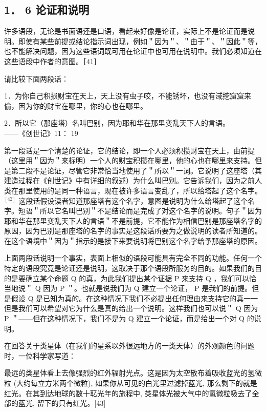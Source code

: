 \subsection{1． 6 论证和说明}
许多语段，无论是书面语还是口语，看起来好像是论证，实际上不是论证而是说明。即使有某些前提或结论指示词出现，例如＂因为＂、＂由于＂、＂因此＂等，也不能解决问题，因为这些语词既可用在论证中也可用在说明中。我们必须知道在这些语段中作者的意图。［41］

请比较下面两段话：

1．为你自己积损财宝在天上，天上没有虫子咬，不能锈坏，也没有淢挖窟窟来偷，因为你的财宝在哪里，你的心也在哪里。

2．所以它（那座塔）名叫巴别，因为耶和华在那里变乱天下人的言语。\\
——《创世记》11： 19

第一段话是一个清楚的论证，它的结论，即一个人必须积攒财宝在天上，由前提（这里用＂因为＂来标明）一个人的财宝积攒在哪里，他的心也在哪里来支持。但是第二段不是论证，尽管它非常恰当地使用了＂所以＂一词。它说明了这座塔（其建造过程在《创世记》中有详细的叙述）为什么叫巴别。它告诉我们，因为之前人类在那里使用的是同一种语言，现在被许多语言变乱了，所以给塔起了这个名字。 ${ }^{[42]}$ 这段话假设读者知道那座塔有这个名字，意图是说明为什么给塔起了这个名字。短语＂所以它名叫巴别＂不是结论而是完成了对这个名字的说明。句子＂因为耶和华在那里变乱天下人的言语＂不是前提，它不能作为相信巴别是那座塔名字的原因，因为巴别是那座塔的名字的事实是这段话所要为之做说明的读者所知道的。在这个语境中＂因为＂指示的是接下来要说明将巴别这个名字给予那座塔的原因。

上面两段话说明一个事实，表面上相似的语段可能具有完全不同的功能。任何一个特定的语段究竟是论证还是说明，这取决于那个语段所服务的目的。如果我们的目的是要确立某个命题 Q 的真，为此我们提出某个证据 P 来支持 Q ，我们可以恰当地说＂ Q 因为 P ＂。也就是说我们为 Q 建立一个论证， P 是我们的前提。但是假设 Q 是已知为真的。在这种情况下我们不必提出任何理由来支持它的真一一但是我们可以希望对它为什么是真的给出一个说明。这样我们也可以说＂ Q 因为 P ＂——但在这种情况下，我们不是为 Q 建立一个论证，而是给出一个对 Q 的说明。

在回答关于类星体（在我们的星系以外很远地方的一类天体）的外观颜色的问题时，一位科学家写道：

\begin{displayquote}
最远的类星体看上去像强烈的红外辐射光点。这是因为太空散布着吸收蓝光的氢微粒 (大约每立方米两个微粒), 如果你从可见的白光里过滤掉蓝光, 那么剩下的就是红光。在其到达地球的数十䎲光年的旅程中, 类星体光被大气中的氢微粒吸去了全部的蓝光, 留下的只有红光。[43]
\end{displayquote}

